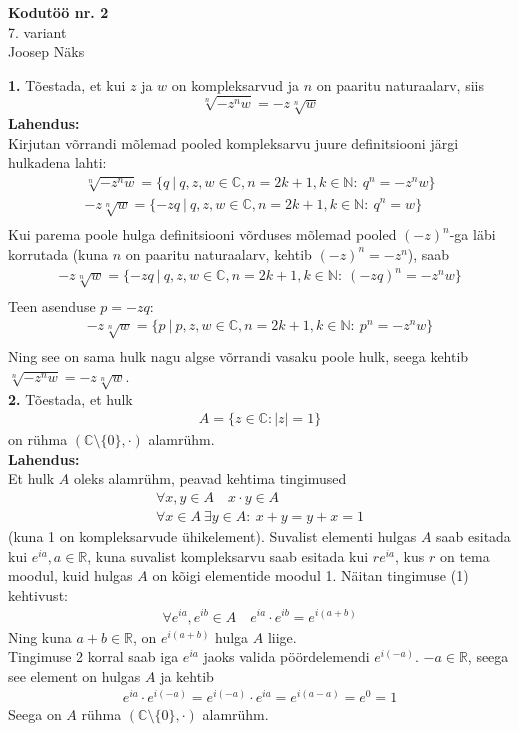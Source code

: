 \documentclass{article}
\begin{document}
\begin{center}
\Large\textbf{Kodutöö nr. 2}\\
7. variant\\
\small{Joosep Näks}
\end{center}
\textbf{1. } Tõestada, et kui $z$ ja $w$ on kompleksarvud ja $n$ on paaritu naturaalarv, siis
\begin {equation*}
\sqrt[n]{-z^nw}=-z\sqrt[n]{w}
\end{equation*}
\textbf{Lahendus:}\\
Kirjutan võrrandi mõlemad pooled kompleksarvu juure definitsiooni järgi hulkadena lahti:
\begin{gather*}
\sqrt[n]{-z^nw}=\{q\ |\ q,z,w\in\mathbb{C}, n=2k+1, k\in\mathbb{N}:\ q^n=-z^nw\}\\
-z\sqrt[n]{w}=\{-zq\ |\ q,z,w\in\mathbb{C}, n=2k+1, k\in\mathbb{N}:\ q^n=w\}\\
\end{gather*}
Kui parema poole hulga definitsiooni võrduses mõlemad pooled $(-z)^n$-ga läbi korrutada (kuna $n$ on paaritu naturaalarv, kehtib $(-z)^n=-z^n$), saab
\begin{gather*}
-z\sqrt[n]{w}=\{-zq\ |\ q,z,w\in\mathbb{C}, n=2k+1, k\in\mathbb{N}:\ (-zq)^n=-z^nw\}\\
\end{gather*}
Teen asenduse $p=-zq$:
\begin{gather*}
-z\sqrt[n]{w}=\{p\ |\ p,z,w\in\mathbb{C}, n=2k+1, k\in\mathbb{N}:\ p^n=-z^nw\}\\
\end{gather*}
Ning see on sama hulk nagu algse võrrandi vasaku poole hulk, seega kehtib $\sqrt[n]{-z^nw}=-z\sqrt[n]{w}$.
\pagebreak\\
\textbf{2.} Tõestada, et hulk
\begin {gather*}
A=\{z\in\mathbb{C}:|z|=1\}
\end{gather*}
on rühma $(\mathbb{C}\setminus\{0\},\cdot)$ alamrühm.\\
\textbf{Lahendus:}\\
Et hulk $A$ oleks alamrühm, peavad kehtima tingimused
\begin{gather}
\forall x,y\in A\quad x\cdot y\in A\\
\forall x\in A\ \exists y\in A:\ x+y=y+x=1
\end{gather}
(kuna 1 on kompleksarvude ühikelement). Suvalist elementi hulgas $A$ saab esitada kui $e^{ia}, a\in\mathbb{R}$, kuna suvalist kompleksarvu saab esitada kui $re^{ia}$, kus $r$ on tema moodul, kuid hulgas $A$ on kõigi elementide moodul 1. Näitan tingimuse (1) kehtivust:
\begin{gather*}
\forall e^{ia},e^{ib}\in A\quad e^{ia}\cdot e^{ib}=e^{i(a+b)}
\end{gather*}
Ning kuna $a+b\in\mathbb{R}$, on $e^{i(a+b)}$ hulga $A$ liige.\\
Tingimuse 2 korral saab iga $e^{ia}$ jaoks valida pöördelemendi $e^{i(-a)}$. $-a\in\mathbb{R}$, seega see element on hulgas $A$ ja kehtib
\begin{gather*}
e^{ia}\cdot e^{i(-a)}=e^{i(-a)}\cdot e^{ia}=e^{i(a-a)}=e^0=1
\end{gather*}
Seega on $A$ rühma $(\mathbb{C}\setminus\{0\},\cdot)$ alamrühm.
\end{document}
